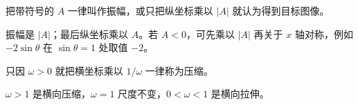 \begin{trapbox}
	\medskip
	\begin{description}[style=nextline, leftmargin=2.8em, labelsep=0.5em, itemsep=0.35em]
		\item[\textbf{\textcolor{CTrap}{易错点四（负系数）：}}] 把带符号的 $A$ 一律叫作振幅，或只把纵坐标乘以 $|A|$ 就认为得到目标图像。
		\item[\textbf{\textcolor{CTrap}{正确理解（翻折）：}}] 振幅是 $|A|$；最后纵坐标乘以 $A$。若 $A<0$，可先乘以 $|A|$ 再关于 $x$ 轴对称，例如 $-2\sin\theta$ 在 $\sin\theta=1$ 处取值 $-2$。
		\item[\textbf{\textcolor{CTrap}{易错点五（伸缩方向）：}}] 只因 $\omega>0$ 就把横坐标乘以 $1/\omega$ 一律称为压缩。
		\item[\textbf{\textcolor{CTrap}{正确理解（分情况）：}}] $\omega>1$ 是横向压缩，$\omega=1$ 尺度不变，$0<\omega<1$ 是横向拉伸。
	\end{description}
\end{trapbox}
